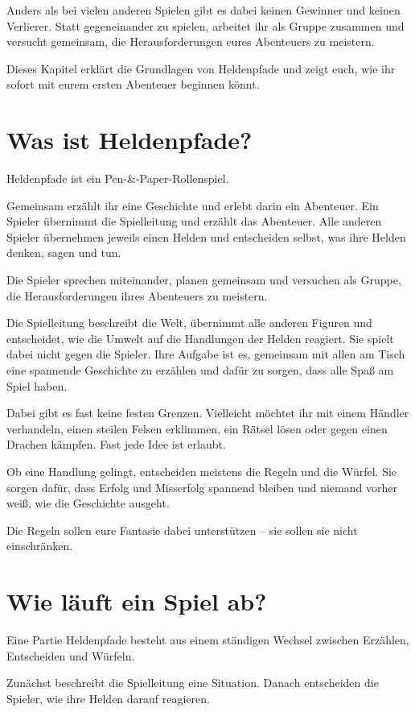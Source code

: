 Anders als bei vielen anderen Spielen gibt es dabei keinen Gewinner und keinen Verlierer. Statt gegeneinander zu spielen, arbeitet ihr als Gruppe zusammen und versucht gemeinsam, die Herausforderungen eures Abenteuers zu meistern.

Dieses Kapitel erklärt die Grundlagen von Heldenpfade und zeigt euch, wie ihr sofort mit eurem ersten Abenteuer beginnen könnt.

\section{Was ist Heldenpfade?}

Heldenpfade ist ein Pen-\&-Paper-Rollenspiel.

Gemeinsam erzählt ihr eine Geschichte und erlebt darin ein Abenteuer. Ein Spieler übernimmt die Spielleitung und erzählt das Abenteuer. Alle anderen Spieler übernehmen jeweils einen Helden und entscheiden selbst, was ihre Helden denken, sagen und tun.

Die Spieler sprechen miteinander, planen gemeinsam und versuchen als Gruppe, die Herausforderungen ihres Abenteuers zu meistern.

Die Spielleitung beschreibt die Welt, übernimmt alle anderen Figuren und entscheidet, wie die Umwelt auf die Handlungen der Helden reagiert. Sie spielt dabei nicht gegen die Spieler. Ihre Aufgabe ist es, gemeinsam mit allen am Tisch eine spannende Geschichte zu erzählen und dafür zu sorgen, dass alle Spaß am Spiel haben.

Dabei gibt es fast keine festen Grenzen. Vielleicht möchtet ihr mit einem Händler verhandeln, einen steilen Felsen erklimmen, ein Rätsel lösen oder gegen einen Drachen kämpfen. Fast jede Idee ist erlaubt.

Ob eine Handlung gelingt, entscheiden meistens die Regeln und die Würfel. Sie sorgen dafür, dass Erfolg und Misserfolg spannend bleiben und niemand vorher weiß, wie die Geschichte ausgeht.

Die Regeln sollen eure Fantasie dabei unterstützen -- sie sollen sie nicht einschränken.

\section{Wie läuft ein Spiel ab?}

Eine Partie Heldenpfade besteht aus einem ständigen Wechsel zwischen Erzählen, Entscheiden und Würfeln.

Zunächst beschreibt die Spielleitung eine Situation. Danach entscheiden die Spieler, wie ihre Helden darauf reagieren.

